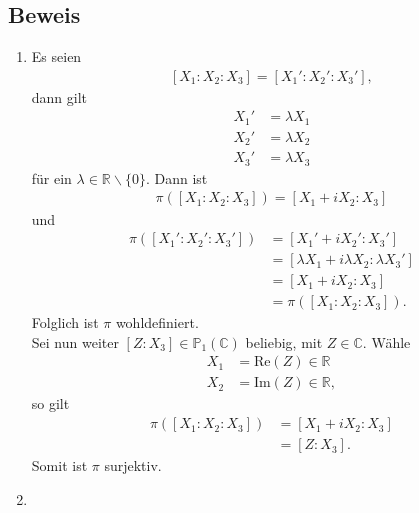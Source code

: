 \documentclass[11pt]{article}
\begin{document}
\subsection*{Beweis}
\begin{enumerate}
	\item  Es seien
	\begin{equation*}
	\begin{aligned}
	\left[X_1:X_2:X_3\right] = \left[X_1':X_2':X_3'\right],
	\end{aligned}
	\end{equation*}
	dann gilt
	\begin{equation*}
	\begin{aligned}
	X_1' &= \lambda X_1\\
	X_2' &= \lambda X_2\\
	X_3' &= \lambda X_3
	\end{aligned}
	\end{equation*}
	für ein $ \lambda \in \mathbb{R}\backslash\lbrace0\rbrace $. Dann ist
	\begin{equation*}
	\begin{aligned}
	\pi \left(\left[X_1:X_2:X_3\right]\right) = \left[X_1+iX_2 : X_3\right]
	\end{aligned}
	\end{equation*}
	und
	\begin{equation*}
	\begin{aligned}
	\pi\left(\left[X_1':X_2':X_3'\right]\right) &= \left[X_1'+iX_2':X_3'\right]\\
	&= \left[\lambda X_1+i\lambda X_2:\lambda X_3'\right]\\
	&=\left[X_1+iX_2 : X_3\right]\\
	&= \pi \left(\left[X_1:X_2:X_3\right]\right).
	\end{aligned}
	\end{equation*}
	Folglich ist $ \pi $ wohldefiniert.\\
	Sei nun weiter $ \left[Z : X_3\right] \in \mathbb{P}_1(\mathbb{C}) $ beliebig, mit $ Z \in \mathbb{C} $. Wähle
	\begin{equation*}
	\begin{aligned}
	X_1 &= \mathrm{Re}(Z) \in \mathbb{R}\\
	X_2 &= \mathrm{Im}(Z) \in \mathbb{R},
	\end{aligned}
	\end{equation*}
	so gilt
	\begin{equation*}
	\begin{aligned}
	\pi\left(\left[X_1:X_2:X_3\right]\right) &= \left[X_1+iX_2:X_3\right]\\
	&= \left[Z: X_3\right].
	\end{aligned}
	\end{equation*}
	Somit ist $ \pi $ surjektiv.
	\item 
\end{enumerate}
\end{document}
